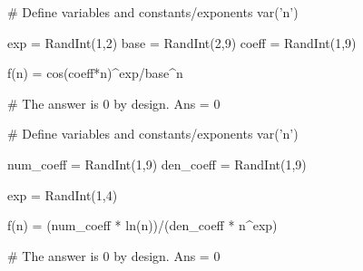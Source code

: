 \begin{sagesilent}
# Define variables and constants/exponents
var('n')

exp   = RandInt(1,2)
base  = RandInt(2,9)
coeff = RandInt(1,9)

f(n) = cos(coeff*n)^exp/base^n

# The answer is 0 by design.
Ans = 0

\end{sagesilent}

\begin{sagesilent}
# Define variables and constants/exponents
var('n')

num_coeff = RandInt(1,9)
den_coeff = RandInt(1,9)

exp = RandInt(1,4)

f(n) = (num_coeff * ln(n))/(den_coeff * n^exp)

# The answer is 0 by design.
Ans = 0

\end{sagesilent}


